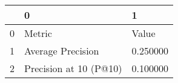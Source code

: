 \begin{tabular}{lll}
\toprule
 & 0 & 1 \\
\midrule
0 & Metric & Value \\
1 & Average Precision & 0.250000 \\
2 & Precision at 10 (P@10) & 0.100000 \\
\bottomrule
\end{tabular}
